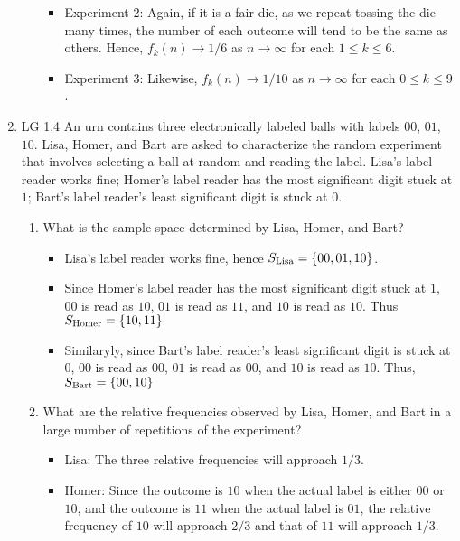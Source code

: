 \begin{enumerate}
\begin{enumerate}
\begin{solution}
\begin{itemize}
				\item Experiment 2:
				Again, if it is a fair die,
				as we repeat tossing the die many times,
				the number of each outcome
				will tend to be the same as others.
				Hence, $f_k(n) \to 1/6$ as $n\to \infty$ for each $1\leq k\leq 6$.

				\item Experiment 3:
				Likewise,
				$f_k(n) \to 1/10$ as $n\to \infty$ for each $0\leq k\leq 9$.
			\end{itemize}
		\end{solution}
	\end{enumerate}
	\fi


	\item LG 1.4
	\ifdefined\sol
	An urn contains three electronically labeled balls with labels
	$00$, $01$, $10$.
	Lisa, Homer, and Bart are asked to characterize the random experiment
	that involves selecting a ball at random and reading the label.
	Lisa's label reader works fine;
	Homer's label reader has the most significant digit stuck at $1$;
	Bart's label reader's least significant digit is stuck at $0$.
	\begin{enumerate}
		\item What is the sample space determined by Lisa, Homer, and Bart?
		\begin{solution}
			\begin{itemize}
				\item Lisa's label reader works fine, hence $S_\mathrm{Lisa} = \{00,01,10\}$.

				\item Since Homer's label reader has the most significant digit stuck at $1$,
				$00$ is read as $10$,
				$01$ is read as $11$,
				and $10$ is read as $10$.
				Thus $S_\mathrm{Homer} = \{10,11\}$

				\item Similaryly, since
				Bart's label reader's least significant digit is stuck at $0$,
				$00$ is read as $00$,
				$01$ is read as $00$,
				and $10$ is read as $10$.
				Thus, $S_\mathrm{Bart} = \{00,10\}$

			\end{itemize}
		\end{solution}

		\item What are the relative frequencies observed by Lisa, Homer, and Bart
		in a large number of repetitions of the experiment?
			\begin{itemize}
				\item Lisa: The three relative frequencies will approach $1/3$.
				\item Homer:
				Since the outcome is $10$ when the actual label is either $00$ or $10$,
				and the outcome is $11$ when the actual label is $01$,
				the relative frequency of $10$ will approach $2/3$
				and that of $11$ will approach $1/3$.


\end{itemize}
\end{enumerate}
\end{enumerate}
